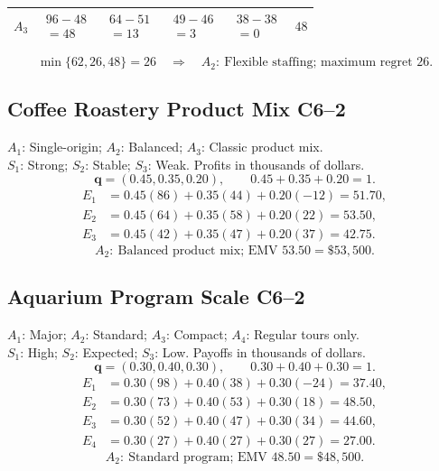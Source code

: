 {\begin{minipage}[t]{0.49\textwidth}
\begin{tabular}{lccccc}
				$A_3$&$\begin{gathered}96-48\\=48\end{gathered}$&$\begin{gathered}64-51\\=13\end{gathered}$&$\begin{gathered}49-46\\=3\end{gathered}$&$\begin{gathered}38-38\\=0\end{gathered}$&$48$\\ \bottomrule\end{tabular}
	\end{minipage}
	\[\min\{62,26,48\}=26
	\quad\Longrightarrow\quad \boxed{A_2:\ \text{Flexible staffing; maximum regret }26.}\]

	\subsection{Coffee Roastery Product Mix \hfill C6--2}
	$A_1$: Single-origin; $A_2$: Balanced; $A_3$: Classic product mix.\\
	$S_1$: Strong; $S_2$: Stable; $S_3$: Weak. Profits in thousands of dollars.
	\[\boldsymbol{q}=(0.45,0.35,0.20),\qquad 0.45+0.35+0.20=1.\]
	\begin{align*}
		E_1&=0.45(86)+0.35(44)+0.20(-12)=51.70,\\
		E_2&=0.45(64)+0.35(58)+0.20(22)=53.50,\\
		E_3&=0.45(42)+0.35(47)+0.20(37)=42.75.
	\end{align*}
	\[\boxed{A_2:\ \text{Balanced product mix; EMV }53.50=\$53{,}500.}\]

	\subsection{Aquarium Program Scale \hfill C6--2}
	$A_1$: Major; $A_2$: Standard; $A_3$: Compact; $A_4$: Regular tours only.\\
	$S_1$: High; $S_2$: Expected; $S_3$: Low. Payoffs in thousands of dollars.
	\[\boldsymbol{q}=(0.30,0.40,0.30),\qquad 0.30+0.40+0.30=1.\]
	\begin{align*}
		E_1&=0.30(98)+0.40(38)+0.30(-24)=37.40,\\
		E_2&=0.30(73)+0.40(53)+0.30(18)=48.50,\\
		E_3&=0.30(52)+0.40(47)+0.30(34)=44.60,\\
		E_4&=0.30(27)+0.40(27)+0.30(27)=27.00.
	\end{align*}
	\[\boxed{A_2:\ \text{Standard program; EMV }48.50=\$48{,}500.}\]

}
